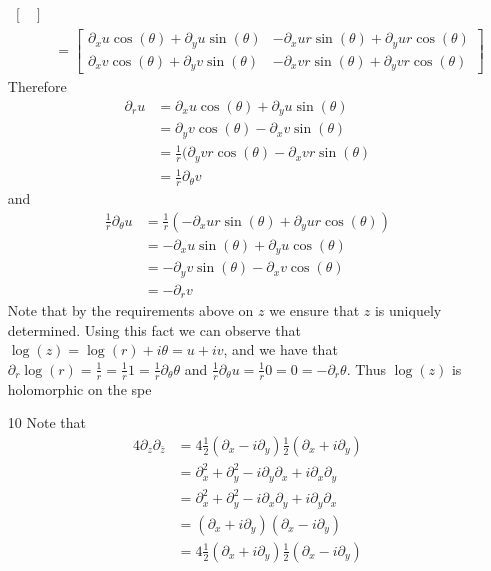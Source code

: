 \documentclass[12pt, letterpaper]{article}
\begin{document}
\begin{enumerate}
\begin{align*}
\begin{bmatrix}
	\end{bmatrix}\\
	&= \begin{bmatrix}
	\partial_x u \cos(\theta) + \partial_y u \sin(\theta) & - \partial_x u r \sin (\theta) + \partial_y u r \cos(\theta)\\
	\partial_x v \cos(\theta) + \partial_y v \sin(\theta) & - \partial_x v r \sin (\theta) + \partial_y v r \cos(\theta)
	\end{bmatrix}
	\end{align*}
	Therefore 
	\begin{align*}
	\partial_r u &= \partial_x u \cos(\theta) + \partial_y u \sin(\theta)\\
	&= \partial_y v \cos(\theta) - \partial_x v \sin(\theta)\\
	&= \frac{1}{r}(\partial_y v r\cos(\theta) - \partial_x v r\sin(\theta)\\
	&= \frac{1}{r}\partial_\theta v
	\end{align*}
	and 
	\begin{align*}
	\frac{1}{r} \partial_\theta u &= \frac{1}{r} (- \partial_x u r \sin (\theta) + \partial_y u r \cos(\theta))\\
	&= - \partial_x u  \sin (\theta) + \partial_y u  \cos(\theta)\\
	&= - \partial_y v \sin(\theta) - \partial_x v \cos(\theta)\\
	&= - \partial_r v
	\end{align*}
	Note that by the requirements above on $z$ we ensure that $z$ is uniquely determined.
	Using this fact we can observe that $\log(z) = \log(r) + i \theta = u + i v$, and 
	we have that $\partial_r \log(r) = \frac{1}{r} = \frac{1}{r} 1 = \frac{1}{r} \partial_\theta \theta$ and $\frac{1}{r} \partial_\theta u = \frac{1}{r} 0 = 0 = -\partial_r \theta$.  Thus $\log(z)$ is holomorphic on the spe
	\item[10] Note that 
	\begin{align*}
		4 \partial_z \partial_{\bar{z}} &= 4 \frac{1}{2} (\partial_x - i \partial_y)\frac{1}{2}(\partial_x + i \partial_y)\\
		&=  \partial_x^2 + \partial_y^2 - i \partial_y \partial_x + i \partial_x \partial_y\\
		&= \partial_x^2 + \partial_y^2 - i \partial_x \partial_y + i \partial_y \partial_x\\
		&= (\partial_x + i \partial_y)(\partial_x - i \partial_y)\\
		&= 4 \frac{1}{2}(\partial_x + i \partial_y)\frac{1}{2}(\partial_x - i \partial_y)\\

\end{align*}
\end{enumerate}
\end{document}
